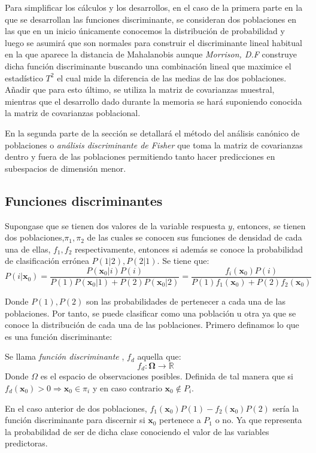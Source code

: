 \noindent Para simplificar los cálculos y los desarrollos, en el caso de la primera parte en la que se desarrollan las funciones discriminante, se consideran dos poblaciones en las que en un inicio únicamente conocemos la distribución de probabilidad\cite{Johnson 2007} y luego se asumirá que son normales para construir el discriminante lineal habitual en la que aparece la distancia de Mahalanobis \cite{Peña 2002} aunque \emph{Morrison, D.F}\cite{Morrison 1976} construye dicha función discriminante buscando una combinación lineal que maximice el estadístico $T^2$ el cual mide la diferencia de las medias de las dos poblaciones. Añadir que para esto último, se utiliza la matriz de covarianzas muestral, mientras que el desarrollo dado durante la memoria se hará suponiendo conocida la matriz de covarianzas poblacional.  

\noindent En la segunda parte de la sección se detallará el método del análisis canónico de poblaciones o \emph{análisis discriminante de Fisher}\cite{Villardón 2006} que toma la matriz de covarianzas dentro y fuera de las poblaciones permitiendo tanto hacer predicciones en subespacios de dimensión menor. 



\subsection{Funciones discriminantes}
\noindent Supongase que se tienen dos valores de la variable respuesta $y$, entonces, se tienen dos poblaciones,$\pi_1, \pi_2$ de las cuales se conocen sus funciones de densidad de cada una de ellas, $f_1,f_2$ respectivamente, entonces si además se conoce la probabilidad de clasificación errónea $P(1|2),P(2|1)$. Se tiene que:
\begin{equation}
P(i|\textbf{x}_0)=\dfrac{P(\textbf{x}_0|i)P(i)}{P(1)P(\textbf{x}_0|1)+P(2)P(\textbf{x}_0|2)}=\dfrac{f_i(\mathbf{x}_0)P(i)}{P(1)f_1(\mathbf{x}_0)+P(2)f_2(\mathbf{x}_0)}
\end{equation}

\noindent Donde $P(1), P(2)$ son las probabilidades de pertenecer a cada una de las poblaciones. Por tanto, se puede clasificar como una población u otra ya que se conoce la distribución de cada una de las poblaciones. Primero definamos lo que es una función discriminante\cite{Cuadras 2014}:

\begin{defi}
Se llama \textit{función discriminante }, $f_{d}$ aquella que:
\begin{equation}
f_{d}:\mathbf{\Omega}\longrightarrow \mathbb{R}
\end{equation}
Donde $\Omega$ es el espacio de observaciones posibles. Definida de tal manera que si $f_{d}(\textbf{x}_0)>0\Rightarrow \textbf{x}_0\in \pi_i$ y en caso contrario $\textbf{x}_0\notin P_i$. 
\end{defi}
\noindent En el caso anterior de dos poblaciones, $f_1(\textbf{x}_0)P(1)-f_2(\textbf{x}_0)P(2)$ sería la función discriminante para discernir si $\textbf{x}_0$ pertenece a $P_1$ o no. Ya que representa la probabilidad de ser de dicha clase conociendo el valor de las variables predictoras.

